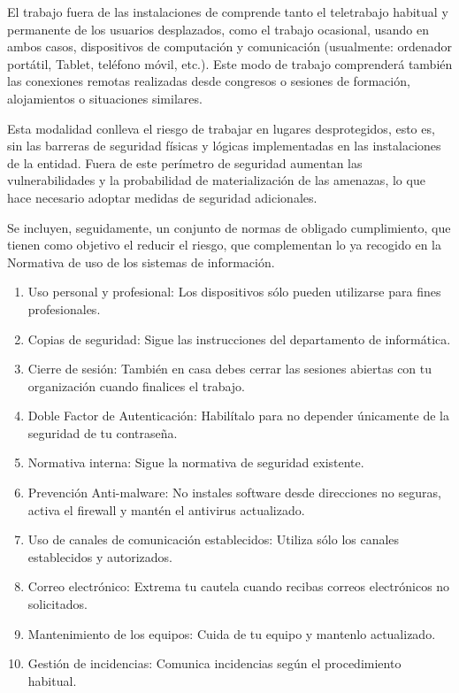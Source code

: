 \begin{enumerate}[label=\alph*)]
El trabajo fuera de las instalaciones de \Beneficiario{} comprende tanto el teletrabajo habitual y permanente de los usuarios desplazados, como el trabajo ocasional, usando en ambos casos, dispositivos de computación y comunicación (usualmente: ordenador portátil, Tablet, teléfono móvil, etc.). Este modo de trabajo comprenderá también las conexiones remotas realizadas desde congresos o sesiones de formación, alojamientos o situaciones similares.

Esta modalidad conlleva el riesgo de trabajar en lugares desprotegidos, esto es, sin las barreras de seguridad físicas y lógicas implementadas en las instalaciones de la entidad. Fuera de este perímetro de seguridad aumentan las vulnerabilidades y la probabilidad de materialización de las amenazas, lo que hace necesario adoptar medidas de seguridad adicionales.

Se incluyen, seguidamente, un conjunto de normas de obligado cumplimiento, que tienen como objetivo el reducir el riesgo, que complementan lo ya recogido en la Normativa de uso de los sistemas de información.

\begin{enumerate}[label=\arabic*)]
    \item Uso personal y profesional: Los dispositivos sólo pueden utilizarse para fines profesionales.
    \item Copias de seguridad: Sigue las instrucciones del departamento de informática.
    \item Cierre de sesión: También en casa debes cerrar las sesiones abiertas con tu organización cuando finalices el trabajo.
    \item Doble Factor de Autenticación: Habilítalo para no depender únicamente de la seguridad de tu contraseña.
    \item Normativa interna: Sigue la normativa de seguridad existente.
    \item Prevención Anti-malware: No instales software desde direcciones no seguras, activa el firewall y mantén el antivirus actualizado.
    \item Uso de canales de comunicación establecidos: Utiliza sólo los canales establecidos y autorizados.
    \item Correo electrónico: Extrema tu cautela cuando recibas correos electrónicos no solicitados.
    \item Mantenimiento de los equipos: Cuida de tu equipo y mantenlo actualizado.
    \item Gestión de incidencias: Comunica incidencias según el procedimiento habitual.
\end{enumerate}

\end{enumerate}